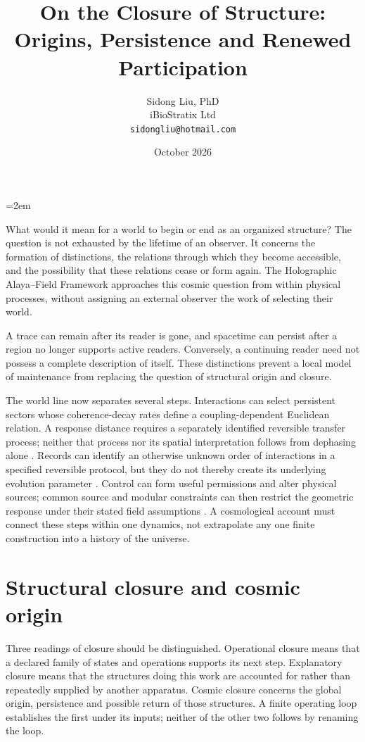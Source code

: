 \documentclass[12pt,a4paper]{article}
\title{On the Closure of Structure:\\Origins, Persistence and Renewed Participation}
\author{Sidong Liu, PhD\\iBioStratix Ltd\\\texttt{sidongliu@hotmail.com}}
\date{October 2026}
\begin{document}
\emergencystretch=2em
\raggedbottom
\maketitle

What would it mean for a world to begin or end as an organized
structure? The question is not exhausted by the lifetime of an observer.
It concerns the formation of distinctions, the relations through which
they become accessible, and the possibility that these relations cease
or form again. The Holographic Alaya--Field Framework approaches this
cosmic question from within physical processes, without assigning an
external observer the work of selecting their world.

A trace can remain after its reader is gone, and spacetime can persist
after a region no longer supports active readers. Conversely, a
continuing reader need not possess a complete description of itself.
These distinctions prevent a local model of maintenance from replacing
the question of structural origin and closure.

The world line now separates several steps. Interactions can select
persistent sectors whose coherence-decay rates define a coupling-dependent
Euclidean relation. A response distance requires a separately identified
reversible transfer process; neither that process nor its spatial
interpretation follows from dephasing alone \cite{A,B}.
Records can identify an otherwise
unknown order of interactions in a specified reversible protocol, but
they do not thereby create its underlying evolution parameter \cite{F}.
Control can form useful permissions and alter physical sources; common
source and modular constraints can then restrict the geometric response
under their stated field assumptions \cite{C,D,G,FoundationIII}.
A cosmological account must connect these steps within one dynamics,
not extrapolate any one finite construction into a history of the universe.

\section{Structural closure and cosmic origin}

Three readings of closure should be distinguished. Operational closure
means that a declared family of states and operations supports its next
step. Explanatory closure means that the structures doing this work are
accounted for rather than repeatedly supplied by another apparatus.
Cosmic closure concerns the global origin, persistence and possible
return of those structures. A finite operating loop establishes the
first under its inputs; neither of the other two follows by renaming
the loop.
\end{document}
